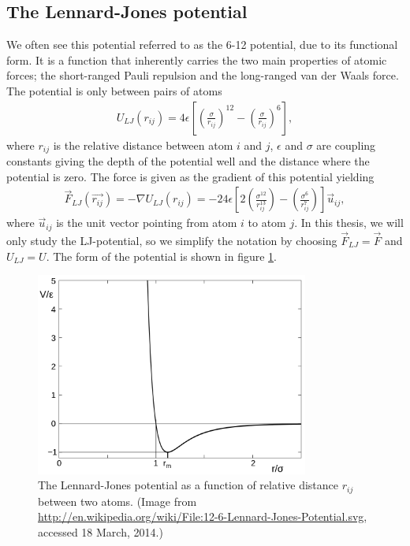 \subsection{The Lennard-Jones potential}
We often see this potential referred to as the 6-12 potential, due to its functional form. It is a function that inherently carries the two main properties of atomic forces; the short-ranged Pauli repulsion and the long-ranged van der Waals force. The potential is only between pairs of atoms
\begin{align}
	\label{eq:md_potential_energy}
	U_{LJ}(r_{ij}) = 4\epsilon\left[\left(\frac{\sigma}{r_{ij}}\right)^{12} - \left(\frac{\sigma}{r_{ij}}\right)^{6}\right],
\end{align}
where $r_{ij}$ is the relative distance between atom $i$ and $j$, $\epsilon$ and $\sigma$ are coupling constants giving the depth of the potential well and the distance where the potential is zero. The force is given as the gradient of this potential yielding 
\begin{align}
	\label{eq:md_lj_force}
	\vec F_{LJ}(\vec{r_{ij}}) = -\nabla U_{LJ}(r_{ij}) = -24\epsilon\left[2\left(\frac{\sigma^{12}}{r_{ij}^{13}}\right) - \left(\frac{\sigma^6}{r_{ij}^7}\right)\right]\vec u_{ij},
\end{align}
where $\vec u_{ij}$ is the unit vector pointing from atom $i$ to atom $j$. In this thesis, we will only study the LJ-potential, so we simplify the notation by choosing $\vec F_{LJ} = \vec F$ and $U_{LJ} = U$. The form of the potential is shown in figure \ref{fig:md_lennard_jones}.
\begin{figure}[h]
\begin{center}
\includegraphics[width=0.8\textwidth, trim=0cm 0cm 0cm 0cm, clip]{MD/figures/lennard_jones.png}
\end{center}
\caption{The Lennard-Jones potential as a function of relative distance $r_{ij}$ between two atoms. (Image from \url{http://en.wikipedia.org/wiki/File:12-6-Lennard-Jones-Potential.svg}, accessed 18 March, 2014.)}
\label{fig:md_lennard_jones}
\end{figure}
